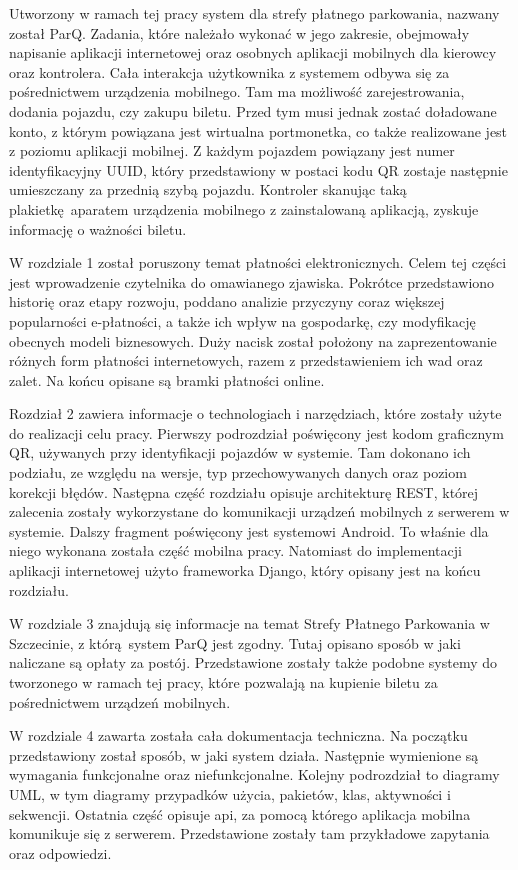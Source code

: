 Utworzony w ramach tej pracy system dla strefy płatnego parkowania, nazwany został ParQ. Zadania, które należało wykonać w jego zakresie, obejmowały napisanie aplikacji internetowej oraz osobnych aplikacji mobilnych dla kierowcy oraz kontrolera. Cała interakcja użytkownika z systemem odbywa się za pośrednictwem urządzenia mobilnego. Tam ma możliwość zarejestrowania, dodania pojazdu, czy zakupu biletu. Przed tym musi jednak zostać doładowane konto, z którym powiązana jest wirtualna portmonetka, co także realizowane jest z poziomu aplikacji mobilnej. Z każdym pojazdem powiązany jest numer identyfikacyjny UUID, który przedstawiony w postaci kodu QR zostaje następnie umieszczany za przednią szybą pojazdu. Kontroler skanując taką plakietkę aparatem urządzenia mobilnego z zainstalowaną aplikacją, zyskuje informację o ważności biletu.

W rozdziale 1 został poruszony temat płatności elektronicznych. Celem tej części jest wprowadzenie czytelnika do omawianego zjawiska. Pokrótce przedstawiono historię oraz etapy rozwoju, poddano analizie przyczyny coraz większej popularności e-płatności, a także ich wpływ na gospodarkę, czy modyfikację obecnych modeli biznesowych. Duży nacisk został położony na zaprezentowanie różnych form płatności internetowych, razem z przedstawieniem ich wad oraz zalet. Na końcu opisane są bramki płatności online.

Rozdział 2 zawiera informacje o technologiach i narzędziach, które zostały użyte do realizacji celu pracy. Pierwszy podrozdział poświęcony jest kodom graficznym QR, używanych przy identyfikacji pojazdów w systemie. Tam dokonano ich podziału, ze względu na wersje, typ przechowywanych danych oraz poziom korekcji błędów. Następna część rozdziału opisuje architekturę REST, której zalecenia zostały wykorzystane do komunikacji urządzeń mobilnych z serwerem w systemie. Dalszy fragment poświęcony jest systemowi Android. To właśnie dla niego wykonana została część mobilna pracy. Natomiast do implementacji aplikacji internetowej użyto frameworka Django, który opisany jest na końcu rozdziału. 

W rozdziale 3 znajdują się informacje na temat Strefy Płatnego Parkowania w Szczecinie, z którą system ParQ jest zgodny. Tutaj opisano sposób w jaki naliczane są opłaty za postój. Przedstawione zostały także podobne systemy do tworzonego w ramach tej pracy, które pozwalają na kupienie biletu za pośrednictwem urządzeń mobilnych.

W rozdziale 4 zawarta została cała dokumentacja techniczna. Na początku przedstawiony został sposób, w jaki system działa. Następnie wymienione są wymagania funkcjonalne oraz niefunkcjonalne. Kolejny podrozdział to diagramy UML, w tym diagramy przypadków użycia, pakietów, klas, aktywności i sekwencji. Ostatnia część opisuje api, za pomocą którego aplikacja mobilna komunikuje się z serwerem. Przedstawione zostały tam przykładowe zapytania oraz odpowiedzi.

